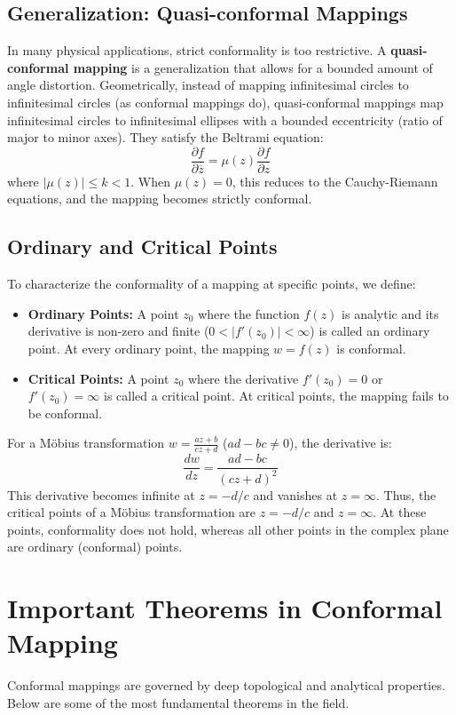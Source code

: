 \documentclass[12pt,a4paper]{article}
\begin{document}
\subsection{Generalization: Quasi-conformal Mappings}
In many physical applications, strict conformality is too restrictive. A \textbf{quasi-conformal mapping} is a generalization that allows for a bounded amount of angle distortion. Geometrically, instead of mapping infinitesimal circles to infinitesimal circles (as conformal mappings do), quasi-conformal mappings map infinitesimal circles to infinitesimal ellipses with a bounded eccentricity (ratio of major to minor axes). They satisfy the Beltrami equation:
\begin{equation}
    \frac{\partial f}{\partial \overline{z}} = \mu(z) \frac{\partial f}{\partial z}
\end{equation}
where $|\mu(z)| \le k < 1$. When $\mu(z) = 0$, this reduces to the Cauchy-Riemann equations, and the mapping becomes strictly conformal.

\subsection{Ordinary and Critical Points}
To characterize the conformality of a mapping at specific points, we define:
\begin{itemize}
    \item \textbf{Ordinary Points:} A point $z_0$ where the function $f(z)$ is analytic and its derivative is non-zero and finite ($0 < |f'(z_0)| < \infty$) is called an ordinary point. At every ordinary point, the mapping $w = f(z)$ is conformal.
    \item \textbf{Critical Points:} A point $z_0$ where the derivative $f'(z_0) = 0$ or $f'(z_0) = \infty$ is called a critical point. At critical points, the mapping fails to be conformal.
\end{itemize}
For a Möbius transformation $w = \frac{az+b}{cz+d}$ ($ad - bc \neq 0$), the derivative is:
\begin{equation}
    \frac{dw}{dz} = \frac{ad - bc}{(cz + d)^2}
\end{equation}
This derivative becomes infinite at $z = -d/c$ and vanishes at $z = \infty$. Thus, the critical points of a Möbius transformation are $z = -d/c$ and $z = \infty$. At these points, conformality does not hold, whereas all other points in the complex plane are ordinary (conformal) points.

\section{Important Theorems in Conformal Mapping}
Conformal mappings are governed by deep topological and analytical properties. Below are some of the most fundamental theorems in the field.
\end{document}
